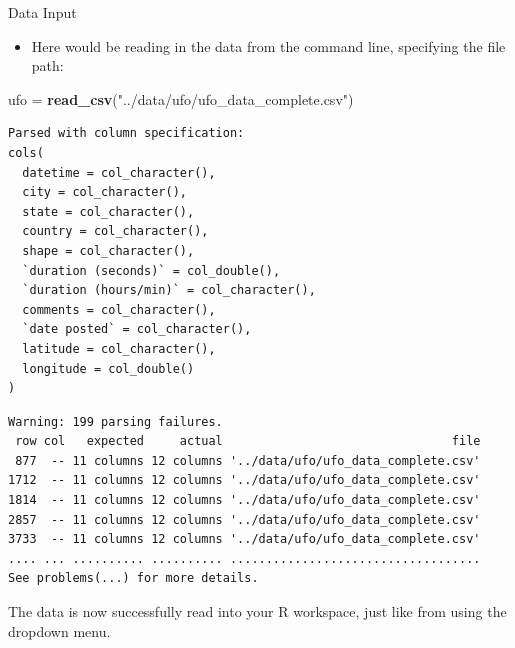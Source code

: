 \documentclass[
  ignorenonframetext,
]{beamer}
\newenvironment{Shaded}{\begin{snugshade}}{\end{snugshade}}
\newcommand{\KeywordTok}[1]{\textcolor[rgb]{0.13,0.29,0.53}{\textbf{#1}}}
\newcommand{\NormalTok}[1]{#1}
\newcommand{\StringTok}[1]{\textcolor[rgb]{0.31,0.60,0.02}{#1}}
\providecommand{\tightlist}{%
  \setlength{\itemsep}{0pt}\setlength{\parskip}{0pt}}
\begin{document}
\begin{frame}[fragile]{Data Input}
\protect\hypertarget{data-input-8}{}

\begin{itemize}
\tightlist
\item
  Here would be reading in the data from the command line, specifying
  the file path:
\end{itemize}

\begin{Shaded}
\begin{Highlighting}[]
\NormalTok{ufo =}\StringTok{ }\KeywordTok{read_csv}\NormalTok{(}\StringTok{"../data/ufo/ufo_data_complete.csv"}\NormalTok{)}
\end{Highlighting}
\end{Shaded}

\begin{verbatim}
Parsed with column specification:
cols(
  datetime = col_character(),
  city = col_character(),
  state = col_character(),
  country = col_character(),
  shape = col_character(),
  `duration (seconds)` = col_double(),
  `duration (hours/min)` = col_character(),
  comments = col_character(),
  `date posted` = col_character(),
  latitude = col_character(),
  longitude = col_double()
)
\end{verbatim}

\begin{verbatim}
Warning: 199 parsing failures.
 row col   expected     actual                                file
 877  -- 11 columns 12 columns '../data/ufo/ufo_data_complete.csv'
1712  -- 11 columns 12 columns '../data/ufo/ufo_data_complete.csv'
1814  -- 11 columns 12 columns '../data/ufo/ufo_data_complete.csv'
2857  -- 11 columns 12 columns '../data/ufo/ufo_data_complete.csv'
3733  -- 11 columns 12 columns '../data/ufo/ufo_data_complete.csv'
.... ... .......... .......... ...................................
See problems(...) for more details.
\end{verbatim}

The data is now successfully read into your R workspace, just like from
using the dropdown menu.

\end{frame}
\end{document}
